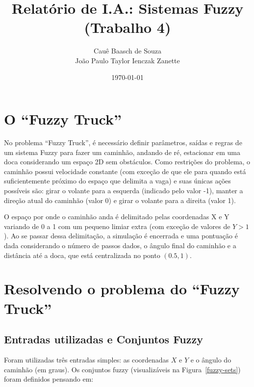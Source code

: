\documentclass[twocolumn]{article}
\title{Relatório de I.A.: Sistemas Fuzzy (Trabalho 4)}
\author{Cauê Baasch de Souza \\
        João Paulo Taylor Ienczak Zanette}
\date{\today}
\newcommand{\todo}[1]{{\color{red}{#1}}}
\begin{document}
    \maketitle{}

    \todo{%
        TO-DO\@:
        \begin{itemize}
            \item Conjuntos Fuzzy;
            \item Regras;
            \item Método de defuzzificação;
            \item Dificuldades encontradas e como foram superadas.
        \end{itemize}
    }

    \section{O ``Fuzzy Truck''}

    No problema ``Fuzzy Truck'', é necessário definir parâmetros, saídas e
    regras de um sistema Fuzzy para fazer um caminhão, andando de ré,
    estacionar em uma doca considerando um espaço 2D sem obstáculos. Como
    restrições do problema, o caminhão possui velocidade constante (com exceção
    de que ele para quando está suficientemente próximo do espaço que delimita
    a vaga) e suas únicas ações possíveis são: girar o volante para a esquerda
    (indicado pelo valor -1), manter a direção atual do caminhão (valor 0) e
    girar o volante para a direita (valor 1).

    O espaço por onde o caminhão anda é delimitado pelas coordenadas X e Y
    variando de 0 a 1 com um pequeno limiar extra (com exceção de valores de $Y
    > 1$). Ao se passar dessa delimitação, a simulação é encerrada e uma
    pontuação é dada considerando o número de passos dados, o ângulo final do
    caminhão e a distância até a doca, que está centralizada no ponto $(0.5,
    1)$.

    \section{Resolvendo o problema do ``Fuzzy Truck''}

    \subsection{Entradas utilizadas e Conjuntos Fuzzy}

    Foram utilizadas três entradas simples: as coordenadas $X$ e $Y$ e o ângulo
    do caminhão (em graus). Os conjuntos fuzzy (visualizáveis na
    Figura~\ref{fuzzy-sets}) foram definidos pensando em:
\end{document}
